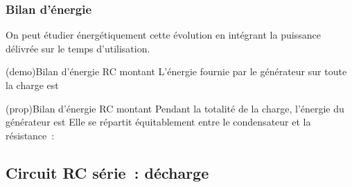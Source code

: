 \documentclass[../../main/main.tex]{subfiles}
\begin{document}
\subsubsection{Bilan d'énergie}
On peut étudier énergétiquement cette évolution en intégrant la puissance
délivrée sur le temps d'utilisation.
\begin{tcb*}[label=demo:rcenerg-charge, breakable]
  (demo){Bilan d'énergie RC montant}
	L'énergie fournie par le générateur sur toute la charge est
	\vspace{-15pt}
\end{tcb*}
\begin{tcb*}[label=prop:rcenerg-charge, sidebyside]
  (prop){Bilan d'énergie RC montant}
	Pendant la totalité de la charge, l'énergie du générateur est
	\psw{%
		\[\boxed{\Ec_G = CE^2}\]
	}%
  \vspace{-15pt}
  \tcblower
	Elle se répartit équitablement entre le condensateur et la résistance~:
	\psw{%
		\[\boxed{\Ec_C = \frac{1}{2} CE^2 = \Ec_J}\]
	}%
	\vspace{-15pt}
\end{tcb*}

\subsection{Circuit RC série~: décharge}
\end{document}
